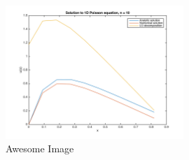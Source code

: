 \documentclass{article}
\begin{document}
\begin{multicols}{2}
\begin{figure}[p]
    \centering
    \includegraphics[width=0.6\textwidth]{Plot_n10.png}
    \caption{Awesome Image}
    \label{fig:awesome_image}
\end{figure}


\end{multicols}
\end{document}
